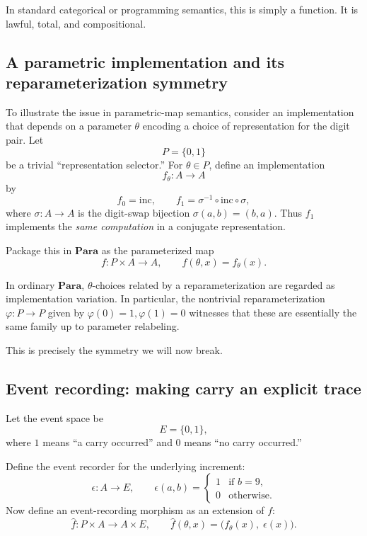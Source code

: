 \documentclass[11pt]{article}
\begin{document}
In standard categorical or programming semantics, this is simply a function. It
is lawful, total, and compositional.

\subsection{A parametric implementation and its reparameterization symmetry}

To illustrate the issue in parametric-map semantics, consider an implementation
that depends on a parameter $\theta$ encoding a choice of representation for the
digit pair. Let
\[
P=\{0,1\}
\]
be a trivial ``representation selector.'' For $\theta\in P$, define an
implementation
\[
f_\theta:A\to A
\]
by
\[
f_0=\mathrm{inc},
\qquad
f_1=\sigma^{-1}\circ \mathrm{inc}\circ \sigma,
\]
where $\sigma:A\to A$ is the digit-swap bijection $\sigma(a,b)=(b,a)$. Thus
$f_1$ implements the \emph{same computation} in a conjugate representation.

Package this in $\mathbf{Para}$ as the parameterized map
\[
f: P\times A \to A,
\qquad
f(\theta,x)=f_\theta(x).
\]

In ordinary $\mathbf{Para}$, $\theta$-choices related by a reparameterization are
regarded as implementation variation. In particular, the nontrivial
reparameterization $\varphi:P\to P$ given by $\varphi(0)=1,\varphi(1)=0$
witnesses that these are essentially the same family up to parameter relabeling.

This is precisely the symmetry we will now break.

\subsection{Event recording: making carry an explicit trace}

Let the event space be
\[
E=\{0,1\},
\]
where $1$ means ``a carry occurred'' and $0$ means ``no carry occurred.''

Define the event recorder for the underlying increment:
\[
\epsilon: A \to E,
\qquad
\epsilon(a,b)=
\begin{cases}
1 & \text{if } b=9,\\
0 & \text{otherwise.}
\end{cases}
\]
Now define an event-recording morphism as an extension of $f$:
\[
\widehat f : P\times A \to A\times E,
\qquad
\widehat f(\theta,x)=\bigl(f_\theta(x),\;\epsilon(x)\bigr).
\]
\end{document}
